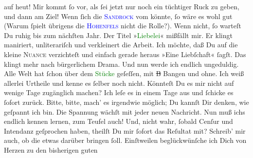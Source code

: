 \documentclass[twoside=false,titlepage=false,open=any, parskip=never, fontsize=12pt, headings=small, chapterprefix=false, appendixprefix=false]{scrbook}
\newcommand{\strikeout}[1]{\sout{#1}}
\newcommand{\pbposition}{\depth}
\newcommand{\pb}{\nobreak\hspace{0pt}\raisebox{-0.1em}{\raisebox{\pbposition}{\textnormal{|}}}\nobreak\hspace{0pt}}
\begin{document}
               auf heut! Mir kommt ſo vor, als ſei jetzt nur noch ein tüchtiger Ruck zu
               geben, und dann am Ziel! Wenn ſich die \textsc{\textcolor{blue}{Sandrock}{}\ledrightnote{\textcolor{blue}{Adele Sandrock}}} vom \label{K_mets_Goldmann_94-partII-5v}\label{K_mets_Goldmann_94-partII-5h} könnte, ſo wäre es wohl gut (Warum ſpielt übrigens die \textsc{\textcolor{blue}{Hohenfels}{}\ledrightnote{\textcolor{blue}{Stella Hohenfels}}} nicht die
               Rolle?). Wenn nicht, ſo warteſt Du ruhig bis zum nächſten Jahr. Der Titel »\textcolor{green}{Liebelei}{}\ledrightnote{\textcolor{green}{Liebelei. Schauspiel in drei Akten}}« mißfällt mir. {\pb}Er klingt maniriert, unliterariſch und verkleinert
               die Arbeit. Ich möchte, daß Du auf die kleine \textsc{Nuance}
               verzichteſt und einfach gerade heraus »Eine Liebſchaft« ſagſt. Das klingt mehr nach
               bürgerlichem Drama. Und nun werde ich endlich ungeduldig. Alle Welt hat ſchon über
               dem \textcolor{green}{Stücke}{} geſeſſen, mit \strikeout{B} Bangen und ohne. Ich weiß allerlei Urtheile und kenne
               es ſelber noch nicht. Könnteſt Du es mir nicht auf wenige Tage zugänglich machen? Ich
               leſe es in einem Tage aus und ſchicke es ſofort zurück. Bitte, bitte, mach’ es
               irgendwie möglich; Du kannſt Dir denken, wie geſpannt {\pb}ich bin. Die Spannung wächſt mit jeder neuen
               Nachricht. Nun muß ichs endlich kennen lernen, zum Teufel auch! Und, nicht wahr,
               ſobald Cenſur und Intendanz geſprochen haben, theilſt Du mir ſofort das Reſultat mit?
               Schreib’ mir auch, ob die \label{K_L02630-3v}\label{K_L02630-3h} etwas darüber bringen ſoll. Einſtweilen
               beglückwünſche ich Dich von Herzen zu den bisherigen guten
\end{document}
